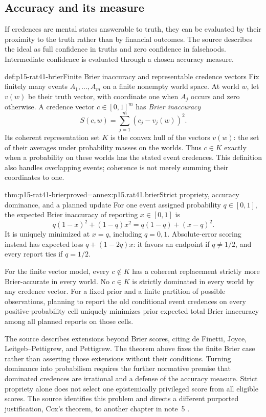 \subsection{Accuracy and its measure}

If credences are mental states answerable to truth, they can be evaluated
by their proximity to the truth rather than by financial outcomes.
The source describes the ideal as full confidence in truths and zero
confidence in falsehoods. Intermediate confidence is evaluated through
a chosen accuracy measure.

\begin{hbdefinition}{def:p15-rat41-brier}{Finite Brier inaccuracy and representable credence vectors}
Fix finitely many events \(A_1,\ldots,A_m\) on a finite nonempty world
space. At world \(w\), let \(v(w)\) be their truth vector, with
coordinate one when \(A_j\) occurs and zero otherwise. A credence vector
\(c\in[0,1]^m\) has \emph{Brier inaccuracy}
\[
            S(c,w)=\sum_{j=1}^m(c_j-v_j(w))^2.
\]
Its coherent representation set \(K\) is the convex hull of the vectors
\(v(w)\): the set of their averages under probability masses on the
worlds. Thus \(c\in K\) exactly when a probability on these worlds
has the stated event credences. This definition also handles overlapping
events; coherence is not merely summing their coordinates to one.
\end{hbdefinition}

\begin{hbtheorem}{thm:p15-rat41-brier}{proved=annex:p15.rat41.brier}{Strict propriety, accuracy dominance, and a planned update}
For one event assigned probability \(q\in[0,1]\), the expected Brier inaccuracy
of reporting \(x\in[0,1]\) is
\[
        q(1-x)^2+(1-q)x^2=q(1-q)+(x-q)^2.
\]
It is uniquely minimized at \(x=q\), including \(q=0,1\).
Absolute-error scoring instead has expected loss \(q+(1-2q)x\):
it favors an endpoint if \(q\ne1/2\), and every report ties if \(q=1/2\).

For the finite vector model, every \(c\notin K\) has a coherent
replacement strictly more Brier-accurate in every world. No \(c\in K\)
is strictly dominated in every world by any credence vector.
For a fixed prior and a finite partition of possible observations,
planning to report the old conditional event credences on every
positive-probability cell uniquely minimizes prior expected total Brier
inaccuracy among all planned reports on those cells.
\end{hbtheorem}

The source describes extensions beyond Brier scores, citing de Finetti,
Joyce, Leitgeb--Pettigrew, and Pettigrew. The theorem above fixes the
finite Brier case rather than asserting those extensions without their
conditions. Turning dominance into probabilism requires the further
normative premise that dominated credences are irrational and a defense
of the accuracy measure. Strict propriety alone does not select one
epistemically privileged score from all eligible scores. The source
identifies this problem and directs a different purported justification,
Cox's theorem, to another chapter in note~5
\parencite[pp.~241--242 and p.~248, n.~5]{HajekStaffel2021Dynamics}.

